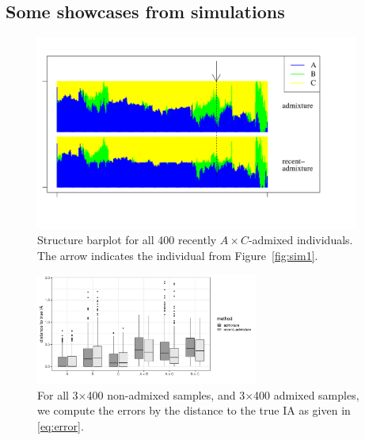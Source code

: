 \documentclass[12pt]{article}
\theoremstyle{definition}
\begin{document}
\subsection{Some showcases from simulations}
\enlargethispage{0cm}
\begin{figure}[H]
  \begin{center}
    \parbox[b]{0.9\textwidth}{\includegraphics[width=0.95\textwidth]{abc_StructurePlot.pdf}\vspace{-2cm}}
  \end{center}
  \caption{\label{Sfig:sim2} Structure barplot for all 400 recently
    $A\times C$-admixed individuals. The arrow indicates the
    individual from Figure~\ref{fig:sim1}.}
\end{figure}

\begin{figure}[H]
  \begin{center}
    \parbox[b]{0.5\textwidth}{\includegraphics[width=0.65\textwidth]{deviations_abc.pdf}\vspace{0cm}}
  \end{center}
  \caption{\label{Sfig:sim3} For all 3$\times$400 non-admixed samples,
    and 3$\times$400 admixed samples, we compute the errors by the
    distance to the true IA as given in \eqref{eq:error}.}
\end{figure}


\newpage
\end{document}
